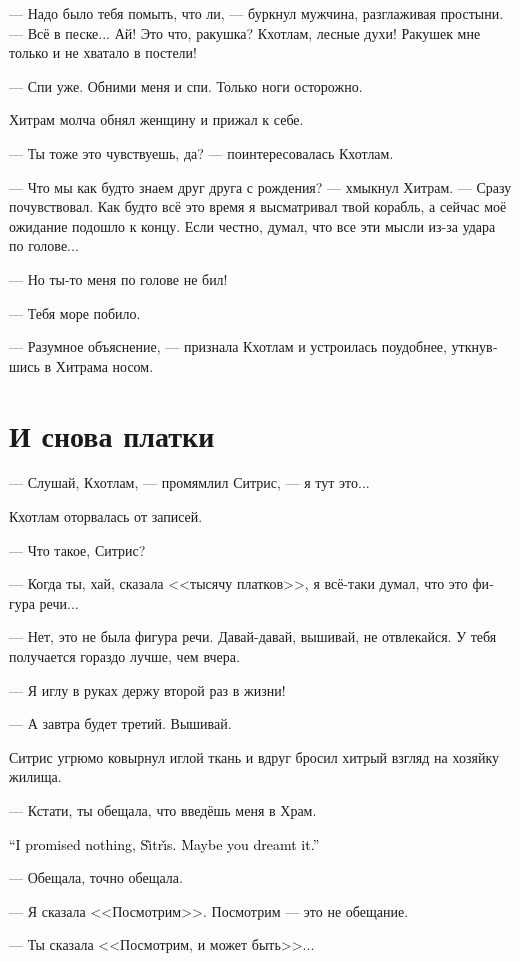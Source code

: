 \documentclass[a4paper,12pt,fleqn]{book}\usepackage{cooltooltips}\usepackage{polyglossia}\setdefaultlanguage{russian}\setotherlanguage{english}\defaultfontfeatures{Ligatures=TeX,Mapping=tex-text} \usepackage{xcolor}\definecolor{lightgray}{HTML}{bbbbbb}\color{lightgray}\newcommand{\ml}[3]{\textenglish{\textcolor{black}{#3}}}
\newcommand{\Sitris}{S\~{\i}tr\v{\i}s}
\begin{document}
--- Надо было тебя помыть, что ли, --- буркнул мужчина, разглаживая простыни.
--- Всё в песке...
Ай!
Это что, ракушка?
Кхотлам, лесные духи!
Ракушек мне только и не хватало в постели!

--- Спи уже.
Обними меня и спи.
Только ноги осторожно.

Хитрам молча обнял женщину и прижал к себе.

--- Ты тоже это чувствуешь, да? --- поинтересовалась Кхотлам.

--- Что мы как будто знаем друг друга с рождения? --- хмыкнул Хитрам.
--- Сразу почувствовал.
Как будто всё это время я высматривал твой корабль, а сейчас моё ожидание подошло к концу.
Если честно, думал, что все эти мысли из-за удара по голове...

--- Но ты-то меня по голове не бил!

--- Тебя море побило.

--- Разумное объяснение, --- признала Кхотлам и устроилась поудобнее, уткнувшись в Хитрама носом.

\section{И снова платки}

--- Слушай, Кхотлам, --- промямлил Ситрис, --- я тут это...

Кхотлам оторвалась от записей.

--- Что такое, Ситрис?

--- Когда ты, хай, сказала <<тысячу платков>>, я всё-таки думал, что это фигура речи...

--- Нет, это не была фигура речи.
Давай-давай, вышивай, не отвлекайся.
У тебя получается гораздо лучше, чем вчера.

--- Я иглу в руках держу второй раз в жизни!

--- А завтра будет третий.
Вышивай.

Ситрис угрюмо ковырнул иглой ткань и вдруг бросил хитрый взгляд на хозяйку жилища.

--- Кстати, ты обещала, что введёшь меня в Храм.

\ml{$0$}
{--- Я тебе ничего не обещала, Ситрис.}
{``I promised nothing, \Sitris.}
\ml{$0$}
{Тебе, наверное, приснилось.}
{Maybe you dreamt it.''}

--- Обещала, точно обещала.

--- Я сказала <<Посмотрим>>.
Посмотрим --- это не обещание.

--- Ты сказала <<Посмотрим, и может быть>>...
\end{document}
